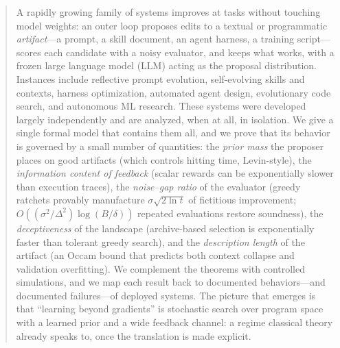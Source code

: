 \documentclass{article}
\theoremstyle{plain}
\theoremstyle{definition}
\theoremstyle{remark}
\begin{document}

\printAffiliationsAndNotice{}

\begin{abstract}
A rapidly growing family of systems improves at tasks without touching model weights: an outer loop proposes edits to a textual or programmatic \emph{artifact}---a prompt, a skill document, an agent harness, a training script---scores each candidate with a noisy evaluator, and keeps what works, with a frozen large language model (LLM) acting as the proposal distribution. Instances include reflective prompt evolution, self-evolving skills and contexts, harness optimization, automated agent design, evolutionary code search, and autonomous ML research. These systems were developed largely independently and are analyzed, when at all, in isolation. We give a single formal model that contains them all, and we prove that its behavior is governed by a small number of quantities: the \emph{prior mass} the proposer places on good artifacts (which controls hitting time, Levin-style), the \emph{information content of feedback} (scalar rewards can be exponentially slower than execution traces), the \emph{noise--gap ratio} of the evaluator (greedy ratchets provably manufacture $\sigma\sqrt{2\ln t}$ of fictitious improvement; $O((\sigma^2/\Delta^2)\log(B/\delta))$ repeated evaluations restore soundness), the \emph{deceptiveness} of the landscape (archive-based selection is exponentially faster than tolerant greedy search), and the \emph{description length} of the artifact (an Occam bound that predicts both context collapse and validation overfitting). We complement the theorems with controlled simulations, and we map each result back to documented behaviors---and documented failures---of deployed systems. The picture that emerges is that ``learning beyond gradients'' is stochastic search over program space with a learned prior and a wide feedback channel: a regime classical theory already speaks to, once the translation is made explicit.
\end{abstract}
\end{document}
